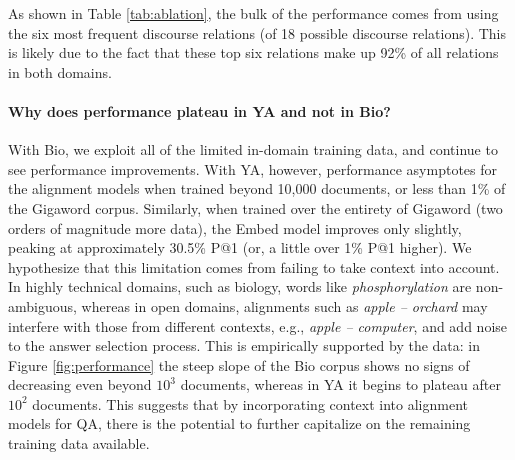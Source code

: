 As shown in Table \ref{tab:ablation}, the bulk of the performance comes from using the six most frequent discourse relations (of 18 possible discourse relations).  This is likely due to the fact that these top six relations make up 92\% of all relations in both domains. 


\paragraph{Why does performance plateau in YA and not in Bio?}

With Bio, we exploit all of the limited in-domain training data, and continue to see performance improvements.  With YA, however, performance asymptotes for the alignment models when trained beyond 10,000 documents, or less than 1\% of the Gigaword corpus.  Similarly, when trained over the entirety of Gigaword (two orders of magnitude more data), the Embed model improves only slightly, peaking at approximately 30.5\% P@1 (or, a little over 1\% P@1 higher).  
We hypothesize that this limitation comes from failing to take context into account. 
In highly technical domains, such as biology, words like {\em phosphorylation} are non-ambiguous, whereas 
in open domains, alignments such as {\em apple -- \mbox{orchard}} may interfere with those from different contexts, e.g., {\em apple -- computer}, and add noise to the answer selection process.  
This is empirically supported by the data: in Figure \ref{fig:performance} the steep slope of the Bio corpus shows no signs of decreasing even beyond $10^{3}$ documents, whereas in YA it begins to plateau after $10^{2}$ documents.  This suggests that by incorporating context into alignment models for QA, there is the potential to further capitalize on the remaining training data available. 


